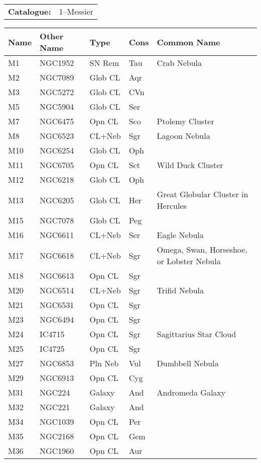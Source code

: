 \begin{tabular}{ p{0.9in} p{1.3in}}
{\bf Catalogue:} & 1--Messier \\ 
\end{tabular}
\begin{longtable}{ p{0.7in}  p{1.0in}  p{0.6in}  p{0.9in}  p{5.1in} }
\hline 
{\bf Name} & {\bf Other Name} & {\bf Type} & {\bf Cons} & {\bf Common Name} \\ 
\hline 
M1 & NGC1952 & SN Rem & Tau & Crab Nebula \\ 
M2 & NGC7089 & Glob CL & Aqr &  \\ 
M3 & NGC5272 & Glob CL & CVn &  \\ 
M5 & NGC5904 & Glob CL & Ser &  \\ 
M7 & NGC6475 & Opn CL & Sco & Ptolemy Cluster \\ 
M8 & NGC6523 & CL+Neb & Sgr & Lagoon Nebula \\ 
M10 & NGC6254 & Glob CL & Oph &  \\ 
M11 & NGC6705 & Opn CL & Sct & Wild Duck Cluster \\ 
M12 & NGC6218 & Glob CL & Oph &  \\ 
M13 & NGC6205 & Glob CL & Her & Great Globular Cluster in Hercules \\ 
M15 & NGC7078 & Glob CL & Peg &  \\ 
M16 & NGC6611 & CL+Neb & Ser & Eagle Nebula \\ 
M17 & NGC6618 & CL+Neb & Sgr & Omega, Swan, Horseshoe, or Lobster Nebula \\ 
M18 & NGC6613 & Opn CL & Sgr &  \\ 
M20 & NGC6514 & CL+Neb & Sgr & Trifid Nebula \\ 
M21 & NGC6531 & Opn CL & Sgr &  \\ 
M23 & NGC6494 & Opn CL & Sgr &  \\ 
M24 & IC4715 & Opn CL & Sgr & Sagittarius Star Cloud \\ 
M25 & IC4725 & Opn CL & Sgr &  \\ 
M27 & NGC6853 & Pln Neb & Vul & Dumbbell Nebula \\ 
M29 & NGC6913 & Opn CL & Cyg &  \\ 
M31 & NGC224 & Galaxy & And & Andromeda Galaxy \\ 
M32 & NGC221 & Galaxy & And &  \\ 
M34 & NGC1039 & Opn CL & Per &  \\ 
M35 & NGC2168 & Opn CL & Gem &  \\ 
M36 & NGC1960 & Opn CL & Aur &  \\ 

\end{longtable}
